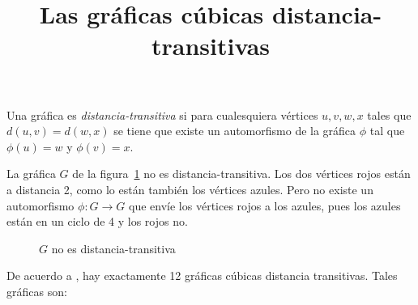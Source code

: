 \documentclass{article}
\title{Las gráficas cúbicas distancia-transitivas}
\date{}
\author{}
\begin{document}
\maketitle

Una gráfica es \emph{distancia-transitiva} si para cualesquiera
vértices $u,v,w,x$ tales que $d(u,v)=d(w,x)$ se tiene que existe un
automorfismo de la gráfica $\phi$ tal que $\phi(u)=w$ y $\phi(v)=x$.

La gráfica $G$ de la figura~\ref{fig:58} no es distancia-transitiva. Los dos vértices rojos están a distancia 2, como lo están también los vértices azules. Pero no existe un automorfismo $\phi\colon G\to G$ que envíe los vértices rojos a los azules, pues los azules están en un ciclo de 4 y los rojos no.

\begin{figure}[htb]
  \centering
  \caption{$G$ no es distancia-transitiva}
  \label{fig:58}
\end{figure}

De acuerdo a \cite{MR0286693}, hay exactamente 12 gráficas cúbicas distancia transitivas. Tales gráficas son:
\end{document}
